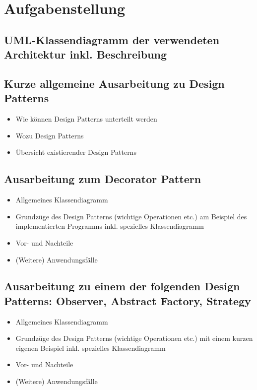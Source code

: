 \section{Aufgabenstellung}
\subsection{UML-Klassendiagramm der verwendeten Architektur inkl. Beschreibung}
\subsection{Kurze allgemeine Ausarbeitung zu Design Patterns}
\begin{itemize}
	\item Wie können Design Patterns unterteilt werden
	\item Wozu Design Patterns
	\item Übersicht existierender Design Patterns
\end{itemize}
\subsection{Ausarbeitung zum Decorator Pattern}
\begin{itemize}
	\item Allgemeines Klassendiagramm
	\item Grundzüge des Design Patterns (wichtige Operationen etc.) am Beispiel des implementierten Programms inkl. spezielles Klassendiagramm
	\item Vor- und Nachteile
	\item (Weitere) Anwendungsfälle
\end{itemize}
\subsection{Ausarbeitung zu \textbf{einem} der folgenden Design Patterns: Observer, Abstract Factory, Strategy}
\begin{itemize}
	\item Allgemeines Klassendiagramm
	\item Grundzüge des Design Patterns (wichtige Operationen etc.) mit einem kurzen eigenen Beispiel inkl. spezielles Klassendiagramm
	\item Vor- und Nachteile
	\item (Weitere) Anwendungsfälle
\end{itemize}




\clearpage
